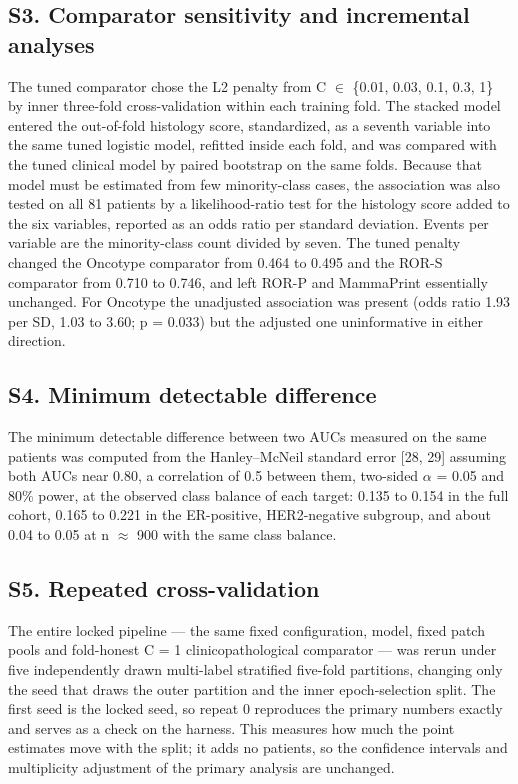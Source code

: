 \documentclass[11pt,a4paper]{article}
\begin{document}
\subsection{S3. Comparator sensitivity and incremental analyses}
The tuned comparator chose the L2 penalty from C $\in$ \{0.01, 0.03, 0.1, 0.3, 1\} by inner three-fold cross-validation within each training fold. The stacked model entered the out-of-fold histology score, standardized, as a seventh variable into the same tuned logistic model, refitted inside each fold, and was compared with the tuned clinical model by paired bootstrap on the same folds. Because that model must be estimated from few minority-class cases, the association was also tested on all 81 patients by a likelihood-ratio test for the histology score added to the six variables, reported as an odds ratio per standard deviation. Events per variable are the minority-class count divided by seven. The tuned penalty changed the Oncotype comparator from 0.464 to 0.495 and the ROR-S comparator from 0.710 to 0.746, and left ROR-P and MammaPrint essentially unchanged. For Oncotype the unadjusted association was present (odds ratio 1.93 per SD, 1.03 to 3.60; p = 0.033) but the adjusted one uninformative in either direction.

\subsection{S4. Minimum detectable difference}
The minimum detectable difference between two AUCs measured on the same patients was computed from the Hanley--McNeil standard error [28, 29] assuming both AUCs near 0.80, a correlation of 0.5 between them, two-sided $\alpha$ = 0.05 and 80\% power, at the observed class balance of each target: 0.135 to 0.154 in the full cohort, 0.165 to 0.221 in the ER-positive, HER2-negative subgroup, and about 0.04 to 0.05 at n $\approx$ 900 with the same class balance.

\subsection{S5. Repeated cross-validation}
The entire locked pipeline --- the same fixed configuration, model, fixed patch pools and fold-honest C = 1 clinicopathological comparator --- was rerun under five independently drawn multi-label stratified five-fold partitions, changing only the seed that draws the outer partition and the inner epoch-selection split. The first seed is the locked seed, so repeat 0 reproduces the primary numbers exactly and serves as a check on the harness. This measures how much the point estimates move with the split; it adds no patients, so the confidence intervals and multiplicity adjustment of the primary analysis are unchanged.
\end{document}
